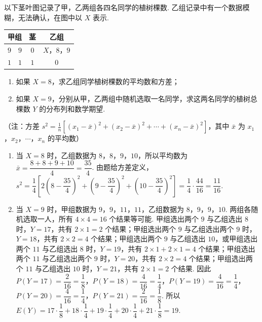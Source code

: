 \begin{problem}
以下茎叶图记录了甲，乙两组各四名同学的植树棵数. 乙组记录中有一个数据模糊，无法确认，在图中以 \(X\) 表示.

\begin{center}
\begin{tabular}{c|c|c}
甲组 & 茎 & 乙组 \\
\hline
\(9\quad 9\) & \(0\) & \(X\)，\(8\)，\(9\) \\
\(1\quad 1\) & \(1\) & \(0\)
\end{tabular}
\end{center}

\begin{enumerate}
\item 如果 \(X = 8\)，求乙组同学植树棵数的平均数和方差；
\item 如果 \(X = 9\)，分别从甲，乙两组中随机选取一名同学，求这两名同学的植树总棵数 \(Y\) 的分布列和数学期望.
\end{enumerate}

（注：方差 \(s^2 = \frac{1}{n}\left[(x_1 - \bar{x})^2 + (x_2 - \bar{x})^2 + \cdots + (x_n - \bar{x})^2\right]\)，其中 \(\bar{x}\) 为 \(x_1\)，\(x_2\)，\(\cdots\)，\(x_n\) 的平均数）

\begin{solution}
\begin{enumerate}
\item 当 \(X=8\) 时，乙组数据为 \(8\)，\(8\)，\(9\)，\(10\)，所以平均数为 \(\bar{x}=\dfrac{8+8+9+10}{4}=\dfrac{35}{4}\). 由题给方差定义，
\(s^2=\dfrac14\left[2\left(8-\dfrac{35}{4}\right)^2+\left(9-\dfrac{35}{4}\right)^2+\left(10-\dfrac{35}{4}\right)^2\right]=\dfrac14\cdot\dfrac{44}{16}=\dfrac{11}{16}\).
\item 当 \(X=9\) 时，甲组数据为 \(9\)，\(9\)，\(11\)，\(11\)，乙组数据为 \(8\)，\(9\)，\(9\)，\(10\). 两组各随机选取一人，所有 \(4\times4=16\) 个结果等可能. 甲组选出两个 \(9\) 与乙组选出 \(8\) 时，\(Y=17\)，共有 \(2\times1=2\) 个结果；甲组选出两个 \(9\) 与乙组选出两个 \(9\) 时，\(Y=18\)，共有 \(2\times2=4\) 个结果；甲组选出两个 \(9\) 与乙组选出 \(10\)，或甲组选出两个 \(11\) 与乙组选出 \(8\) 时，\(Y=19\)，共有 \(2\times1+2\times1=4\) 个结果；甲组选出两个 \(11\) 与乙组选出两个 \(9\) 时，\(Y=20\)，共有 \(2\times2=4\) 个结果；甲组选出两个 \(11\) 与乙组选出 \(10\) 时，\(Y=21\)，共有 \(2\times1=2\) 个结果. 因此
\(P(Y=17)=\dfrac{2}{16}=\dfrac18\)，\(P(Y=18)=\dfrac{4}{16}=\dfrac14\)，\(P(Y=19)=\dfrac{4}{16}=\dfrac14\)，\(P(Y=20)=\dfrac{4}{16}=\dfrac14\)，\(P(Y=21)=\dfrac{2}{16}=\dfrac18\). 所以
\(E(Y)=17\cdot\dfrac18+18\cdot\dfrac14+19\cdot\dfrac14+20\cdot\dfrac14+21\cdot\dfrac18=19\).
\end{enumerate}
\end{solution}
\end{problem}

